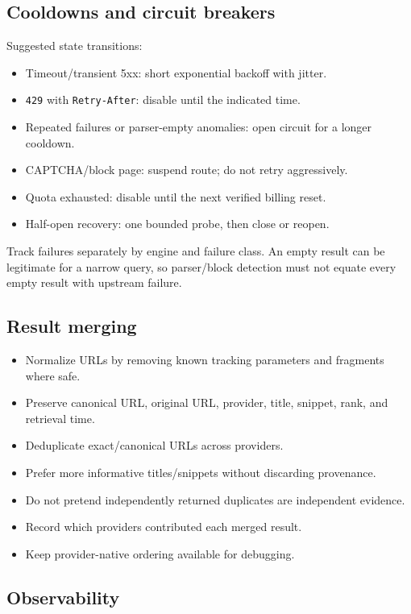 \documentclass[11pt]{article}
\begin{document}
\subsection*{Cooldowns and circuit breakers}
\label{sec:orgc663866}

Suggested state transitions:

\begin{itemize}
\item Timeout/transient 5xx: short exponential backoff with jitter.
\item \texttt{429} with \texttt{Retry-After}: disable until the indicated time.
\item Repeated failures or parser-empty anomalies: open circuit for a longer
cooldown.
\item CAPTCHA/block page: suspend route; do not retry aggressively.
\item Quota exhausted: disable until the next verified billing reset.
\item Half-open recovery: one bounded probe, then close or reopen.
\end{itemize}

Track failures separately by engine and failure class.  An empty result can be
legitimate for a narrow query, so parser/block detection must not equate every
empty result with upstream failure.
\subsection*{Result merging}
\label{sec:org60073fe}

\begin{itemize}
\item Normalize URLs by removing known tracking parameters and fragments where
safe.
\item Preserve canonical URL, original URL, provider, title, snippet, rank, and
retrieval time.
\item Deduplicate exact/canonical URLs across providers.
\item Prefer more informative titles/snippets without discarding provenance.
\item Do not pretend independently returned duplicates are independent evidence.
\item Record which providers contributed each merged result.
\item Keep provider-native ordering available for debugging.
\end{itemize}
\subsection*{Observability}
\label{sec:org89749b5}
\end{document}
